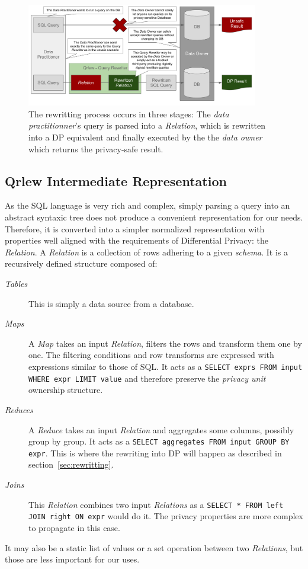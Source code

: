 \documentclass[letterpaper]{article} %
\begin{document}
\begin{figure}[t]
    \centering
    \includegraphics[width=0.9\textwidth]{figures/qrlew_process} %
    \caption{The rewritting process occurs in three stages: The \emph{data practitionner}'s query is parsed into a \emph{Relation}, which is rewritten into a DP equivalent and finally executed by the the \emph{data owner} which returns the privacy-safe result.}
    \label{fig:process}
\end{figure}

\subsection{Qrlew Intermediate Representation}
\label{sec:intermediate_representation}

As the SQL language is very rich and complex, simply parsing a query into an abstract syntaxic tree does not produce a convenient representation for our needs. Therefore, it is converted into a simpler normalized representation with properties well aligned with the requirements of Differential Privacy: the \emph{Relation}. A \emph{Relation} is a collection of rows adhering to a given \emph{schema}. It is a recursively defined structure composed of:
\begin{description}
    \item[\emph{Tables}] This is simply a data source from a database.
    \item[\emph{Maps}] A \emph{Map} takes an input \emph{Relation}, filters the rows and transform them one by one. The filtering conditions and row transforms are expressed with expressions similar to those of SQL. It acts as a \texttt{SELECT exprs FROM input WHERE expr LIMIT value} and therefore preserve the \emph{privacy unit} ownership structure.
    \item[\emph{Reduces}] A \emph{Reduce} takes an input \emph{Relation} and aggregates some columns, possibly group by group. It acts as a \texttt{SELECT aggregates FROM input GROUP BY expr}. This is where the rewriting into DP will happen as described in section~\ref{sec:rewritting}.
    \item[\emph{Joins}] This \emph{Relation} combines two input \emph{Relations} as a \texttt{SELECT * FROM left JOIN right ON expr} would do it. The privacy properties are more complex to propagate in this case.
\end{description}
It may also be a static list of values or a set operation between two \emph{Relations}, but those are less important for our uses.
\end{document}
